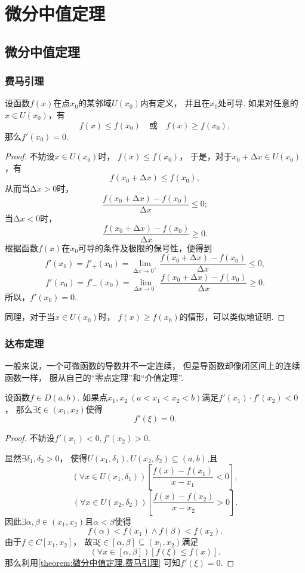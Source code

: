 \chapter{微分中值定理}
\section{微分中值定理}
\subsection{费马引理}
\begin{lemma}[费马引理]\label{theorem:微分中值定理.费马引理}
设函数\(f(x)\)在点\(x_0\)的某邻域\(U(x_0)\)内有定义，
并且在\(x_0\)处可导.
如果对任意的\(x \in U(x_0)\)，有
\[
    f(x) \leq f(x_0)
    \quad\text{或}\quad
    f(x) \geq f(x_0),
\]
那么\(f'(x_0) = 0\).
\begin{proof}
不妨设\(x \in U(x_0)\)时，
\(f(x) \leq f(x_0)\)，
于是，对于\(x_0 + \increment x \in U(x_0)\)，有\[
    f(x_0 + \increment x) \leq f(x_0),
\]
从而当\(\increment x > 0\)时，\[
    \frac{f(x_0 + \increment x) - f(x_0)}{\increment x} \leq 0;
\]
当\(\increment x < 0\)时，\[
    \frac{f(x_0 + \increment x) - f(x_0)}{\increment x} \geq 0.
\]
根据函数\(f(x)\)在\(x_0\)可导的条件及极限的保号性，便得到\[
    f'(x_0) = f'_+(x_0)
    = \lim\limits_{\increment x\to0^+}
    \frac{f(x_0 + \increment x) - f(x_0)}{\increment x} \leq 0,
\]\[
    f'(x_0) = f'_-(x_0)
    = \lim\limits_{\increment x\to0^-}
    \frac{f(x_0 + \increment x) - f(x_0)}{\increment x} \geq 0.
\]
所以，\(f'(x_0) = 0\).

同理，对于当\(x \in U(x_0)\)时，
\(f(x) \geq f(x_0)\)的情形，可以类似地证明.
\end{proof}
\end{lemma}

\subsection{达布定理}
一般来说，一个可微函数的导数并不一定连续，
但是导函数却像闭区间上的连续函数一样，
服从自己的“零点定理”和“介值定理”.

\begin{theorem}[达布零点定理]\label{theorem:微分中值定理.达布定理1}
设函数\(f \in D(a,b)\).
如果点\(x_1,x_2\ (a<x_1<x_2<b)\)满足\(f'(x_1) \cdot f'(x_2) < 0\)，
那么\(\exists\xi\in(x_1,x_2)\)使得\[
f'(\xi) = 0.
\]
\begin{proof}
不妨设\(f'(x_1)<0,f'(x_2)>0\).

显然\(\exists\delta_1,\delta_2>0\)，
使得\(U(x_1,\delta_1),U(x_2,\delta_2)\subseteq(a,b)\),且\[
	(\forall x \in U(x_1,\delta_1))
	[\frac{f(x)-f(x_1)}{x-x_1}<0],
\]\[
	(\forall x \in U(x_2,\delta_2))
	[\frac{f(x)-f(x_2)}{x-x_2}>0].
\]
因此\(\exists\alpha,\beta\in(x_1,x_2)\)且\(\alpha<\beta\)使得\[
	f(\alpha)<f(x_1) \land f(\beta)<f(x_2).
\]
由于\(f \in C[x_1,x_2]\)，
故\(\exists\xi\in[\alpha,\beta]\subseteq(x_1,x_2)\)满足\[
	(\forall x\in[\alpha,\beta])
	[f(\xi) \leq f(x)].
\]
那么利用\cref{theorem:微分中值定理.费马引理} 可知\(f'(\xi)=0\).
\end{proof}
\end{theorem}

